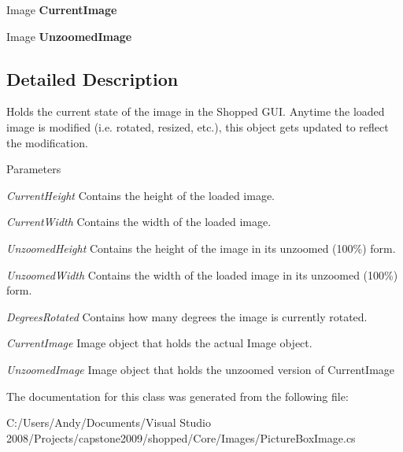 \begin{DoxyCompactItemize}
\item 
\hypertarget{class_core_1_1_images_1_1_picture_box_image_aee6569c4f810e2e90caa9417475ac62a}{
Image {\bfseries CurrentImage}}
\label{class_core_1_1_images_1_1_picture_box_image_aee6569c4f810e2e90caa9417475ac62a}

\item 
\hypertarget{class_core_1_1_images_1_1_picture_box_image_a3078df347f79d1d2e10da136fede49d1}{
Image {\bfseries UnzoomedImage}}
\label{class_core_1_1_images_1_1_picture_box_image_a3078df347f79d1d2e10da136fede49d1}

\end{DoxyCompactItemize}


\subsection{Detailed Description}
Holds the current state of the image in the Shopped GUI. Anytime the loaded image is modified (i.e. rotated, resized, etc.), this object gets updated to reflect the modification.


\begin{DoxyParams}{Parameters}
\item[{\em CurrentHeight}]Contains the height of the loaded image. \item[{\em CurrentWidth}]Contains the width of the loaded image. \item[{\em UnzoomedHeight}]Contains the height of the image in its unzoomed (100\%) form. \item[{\em UnzoomedWidth}]Contains the width of the loaded image in its unzoomed (100\%) form. \item[{\em DegreesRotated}]Contains how many degrees the image is currently rotated. \item[{\em CurrentImage}]Image object that holds the actual Image object. \item[{\em UnzoomedImage}]Image object that holds the unzoomed version of CurrentImage \end{DoxyParams}


The documentation for this class was generated from the following file:\begin{DoxyCompactItemize}
\item 
C:/Users/Andy/Documents/Visual Studio 2008/Projects/capstone2009/shopped/Core/Images/PictureBoxImage.cs\end{DoxyCompactItemize}
